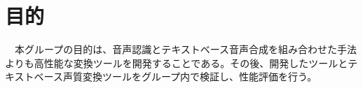 \section{目的}
\par　本グループの目的は、音声認識とテキストベース音声合成を組み合わせた手法よりも高性能な変換ツールを開発することである。その後、開発したツールとテキストベース声質変換ツールをグループ内で検証し、性能評価を行う。
\bunseki{}
